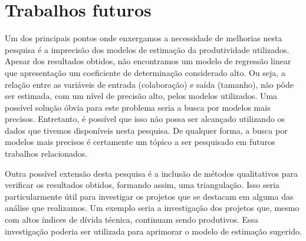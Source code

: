 \begin{comment}
A literatura sugere que projetos maiores vão ter um prejuizo de produtividade devido à complexidade adicional trazida pelo seu tamanho. Realizar alterações em um projeto menor normalmente é mais fácil do que realizar alterações em projetos menores. Isso deveria ser considerado em um modelo como o nosso que tem como base uma estimação de produtividade.

Existem muitos problemas com os dados do GHTOrrent. O melhor teria sido obter apenas algumas informação de lá e o restante diretamente da API do GitHub.



É possível que a popularidade do projeto seja influenciada significativamente quando ele é desenvolvido por uma empresa grande. Ou seja,a causa de um projeto ter um alto número de estrelas não necessariamente é devido a relevância que a comunidade dá ao projeto. Ao invés disso, a popularidade do projeto pode ter sido obtida devido a popularidade da empresa. Um exemplo é o caso do projeto blitz4j que possui 504 estrelas. Enquanto isso, o projeto tinylog possui apenas 142. Entretanto, uma pesquisa em sites de buscas revelam que o tinylog é 4 vezes mais citado que o blitz4j. Logo, a maior quantidade de estrelas do blitz4j não reflete a sua popularidade entre os desenvolvedores.

\end{comment}

\section{Trabalhos futuros}

Um dos principais pontos onde enxergamos a necessidade de melhorias nesta pesquisa é a imprecisão dos modelos de estimação da produtividade utilizados. Apesar dos resultados obtidos, não encontramos um modelo de regressão linear que apresentação um coeficiente de determinação considerado alto. Ou seja, a relação entre as variáveis de entrada (colaboração) e saída (tamanho), não pôde ser estimada, com um nível de precisão alto, pelos modelos utilizados. Uma possível solução óbvia para este problema seria a busca por modelos mais precisos. Entretanto, é possível que isso não possa ser alcançado utilizando os dados que tivemos disponíveis nesta pesquisa. De qualquer forma, a busca por modelos mais precisos é certamente um tópico a ser pesquisado em futuros trabalhos relacionados.

Outra possível extensão desta pesquisa é a inclusão de métodos qualitativos para verificar os resultados obtidos, formando assim, uma triangulação\cite{fielding2012triangulation}. Isso seria particularmente útil para investigar os projetos que se destacam em alguma das análise que realizamos. Um exemplo seria a investigação dos projetos que, mesmo com altos índices de dívida técnica, continuam sendo produtivos. Essa investigação poderia ser utilizada para aprimorar o modelo de estimação sugerido. 

